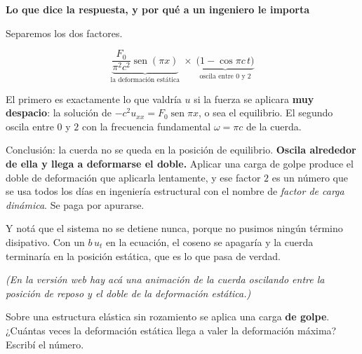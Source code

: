 \documentclass[
  spanish,
  a4paper,
]{scrbook}
\theoremstyle{definition}
\theoremstyle{plain}
\theoremstyle{definition}
\theoremstyle{plain}
\theoremstyle{definition}
\theoremstyle{remark}
\begin{document}
\begin{tcolorbox}[enhanced jigsaw, arc=.35mm, bottomrule=.15mm, breakable, colback=white, colframe=quarto-callout-important-color-frame, left=2mm, leftrule=.75mm, opacityback=0, rightrule=.15mm, toprule=.15mm]
\begin{minipage}[t]{5.5mm}
\textcolor{quarto-callout-important-color}{\faExclamation}
\end{minipage}%
\begin{minipage}[t]{\textwidth - 5.5mm}

\vspace{-3mm}\textbf{Lo que dice la respuesta, y por qué a un ingeniero le importa}\vspace{3mm}

Separemos los dos factores.

\[
\underbrace{\frac{F_0}{\pi^2c^2}\operatorname{sen}(\pi x)}_{\text{la deformación estática}}
\;\times\;
\underbrace{\big(1-\cos\pi c\,t\big)}_{\text{oscila entre 0 y 2}}
\]

El primero es exactamente lo que valdría \(u\) si la fuerza se aplicara
\textbf{muy despacio}: la solución de
\(-c^2u_{xx} = F_0\operatorname{sen}\pi x\), o sea el equilibrio. El
segundo oscila entre \(0\) y \(2\) con la frecuencia fundamental
\(\omega = \pi c\) de la cuerda.

Conclusión: la cuerda no se queda en la posición de equilibrio.
\textbf{Oscila alrededor de ella y llega a deformarse el doble.} Aplicar
una carga de golpe produce el doble de deformación que aplicarla
lentamente, y ese factor \(2\) es un número que se usa todos los días en
ingeniería estructural con el nombre de \emph{factor de carga dinámica}.
Se paga por apurarse.

Y notá que el sistema no se detiene nunca, porque no pusimos ningún
término disipativo. Con un \(b\,u_t\) en la ecuación, el coseno se
apagaría y la cuerda terminaría en la posición estática, que es lo que
pasa de verdad.

\end{minipage}%
\end{tcolorbox}

\emph{(En la versión web hay acá una animación de la cuerda oscilando
entre la posición de reposo y el doble de la deformación estática.)}

Sobre una estructura elástica sin rozamiento se aplica una carga
\textbf{de golpe}. ¿Cuántas veces la deformación estática llega a valer
la deformación máxima? Escribí el número.
\end{document}
